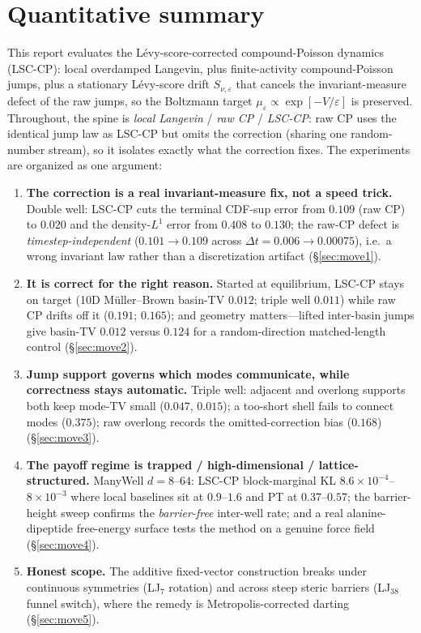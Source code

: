\section{Quantitative summary}
\label{sec:summary}

This report evaluates the L\'evy-score-corrected compound-Poisson dynamics (LSC-CP): local
overdamped Langevin, plus finite-activity compound-Poisson jumps, plus a stationary L\'evy-score
drift $S_{\nu,\varepsilon}$ that cancels the invariant-measure defect of the raw jumps, so the
Boltzmann target $\mu_\varepsilon\propto\exp[-V/\varepsilon]$ is preserved. Throughout, the spine
is \emph{local Langevin} / \emph{raw CP} / \emph{LSC-CP}: raw CP uses the identical jump law as
LSC-CP but omits the correction (sharing one random-number stream), so it isolates exactly what the
correction fixes. The experiments are organized as one argument:
\begin{enumerate}
  \item \textbf{The correction is a real invariant-measure fix, not a speed trick.} Double well:
    LSC-CP cuts the terminal CDF-sup error from $0.109$ (raw CP) to $0.020$ and the density-$L^1$
    error from $0.408$ to $0.130$; the raw-CP defect is \emph{timestep-independent}
    ($0.101\!\to\!0.109$ across $\Delta t=0.006\!\to\!0.00075$), i.e.\ a wrong invariant law rather
    than a discretization artifact (\S\ref{sec:move1}).
  \item \textbf{It is correct for the right reason.} Started at equilibrium, LSC-CP stays on target
    (10D M\"uller--Brown basin-TV $0.012$; triple well $0.011$) while raw CP drifts off it
    ($0.191$; $0.165$); and geometry matters---lifted inter-basin jumps give basin-TV $0.012$
    versus $0.124$ for a random-direction matched-length control (\S\ref{sec:move2}).
  \item \textbf{Jump support governs which modes communicate, while correctness stays automatic.}
    Triple well: adjacent and overlong supports both keep mode-TV small ($0.047$, $0.015$); a
    too-short shell fails to connect modes ($0.375$); raw overlong records the omitted-correction
    bias ($0.168$) (\S\ref{sec:move3}).
  \item \textbf{The payoff regime is trapped / high-dimensional / lattice-structured.} ManyWell
    $d=8$--$64$: LSC-CP block-marginal KL $8.6\times10^{-4}$--$8\times10^{-3}$ where local baselines
    sit at $0.9$--$1.6$ and PT at $0.37$--$0.57$; the barrier-height sweep confirms the
    \emph{barrier-free} inter-well rate; and a real alanine-dipeptide free-energy surface tests the
    method on a genuine force field (\S\ref{sec:move4}).
  \item \textbf{Honest scope.} The additive fixed-vector construction breaks under continuous
    symmetries (LJ$_7$ rotation) and across steep steric barriers (LJ$_{38}$ funnel switch), where
    the remedy is Metropolis-corrected darting (\S\ref{sec:move5}).
\end{enumerate}

